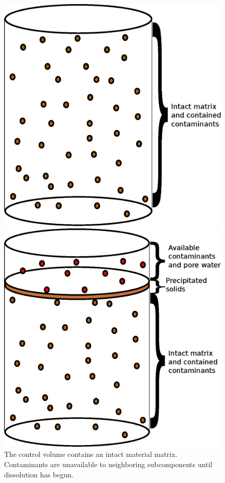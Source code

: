 \begin{figure}[h!]
\begin{minipage}[b]{0.5\linewidth}
  \begin{center}
    \includegraphics[width=0.9\linewidth]{./chapters/methodology/nuclide_models/mixed_cell/mixed_cell_whole.eps}
  \end{center}
  \caption[Intact Mixed Cell Control Volume]{The control volume contains an 
  intact material matrix. Contaminants are unavailable to neighboring 
  subcomponents until dissolution has begun.}
  \label{fig:intact}
\end{minipage}
\hspace{0.5cm}
\begin{minipage}[b]{0.5\linewidth}
  \begin{center}
    \includegraphics[width=0.9\linewidth]{./chapters/methodology/nuclide_models/mixed_cell/mixed_cell_degraded.eps}

\end{center}
\end{minipage}
\end{figure}
